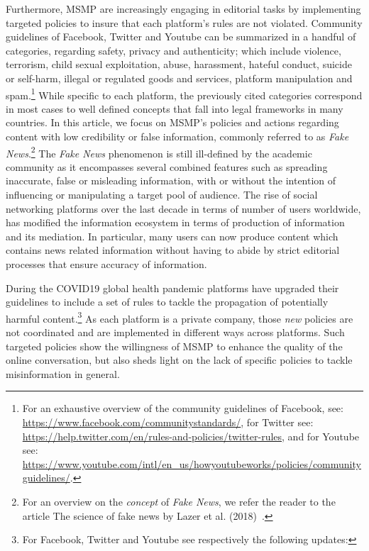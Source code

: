 \documentclass[11pt,a4paper]{article}
\begin{document}
\smallskip

Furthermore, MSMP are increasingly engaging in editorial tasks by implementing targeted policies to insure that each platform's rules are not violated. Community guidelines of Facebook, Twitter and Youtube can be summarized in a handful of categories, regarding safety, privacy and authenticity; which include violence, terrorism, child sexual exploitation, abuse, harassment, hateful conduct, suicide or self-harm, illegal or regulated goods and services, platform manipulation and spam.\footnote{For an exhaustive overview of the community guidelines of Facebook, see: \href{https://www.facebook.com/communitystandards/}{https://www.facebook.com/communitystandards/}, for Twitter see: \href{https://help.twitter.com/en/rules-and-policies/twitter-rules}{https://help.twitter.com/en/rules-and-policies/twitter-rules}, and for Youtube see: \href{https://www.youtube.com/intl/en\_us/howyoutubeworks/policies/community\-guidelines/}{https://www.youtube.com/intl/en\_us/howyoutubeworks/policies/community\-guidelines/}.} While specific to each platform, the previously cited categories correspond in most cases to well defined concepts that fall into legal frameworks in many countries. In this article, we focus on MSMP's policies and actions regarding content with low credibility or false information, commonly referred to as {\it Fake News}.\footnote{For an overview on the {\it concept} of {\it Fake News}, we refer the reader to the article The science of fake news by Lazer et al. (2018)~\cite{lazer}.} The {\it Fake News} phenomenon is still ill-defined by the academic community as it encompasses several combined features such as spreading inaccurate, false or misleading information, with or without the intention of influencing or manipulating a target pool of audience. The rise of social networking platforms over the last decade in terms of number of users worldwide, has modified the information ecosystem in terms of production of information and its mediation. In particular, many users can now produce content which contains news related information without having to abide by strict editorial processes that ensure accuracy of information. 

\smallskip

During the COVID19 global health pandemic platforms have upgraded their guidelines to include a set of rules to tackle the propagation of potentially harmful content.\footnote{For Facebook, Twitter and Youtube see respectively the following updates: } As each platform is a private company, those {\it new} policies are not coordinated and are implemented in different ways across platforms. Such targeted policies show the willingness of MSMP to enhance the quality of the online conversation, but also sheds light on the lack of specific policies to tackle misinformation in general. 
\end{document}
